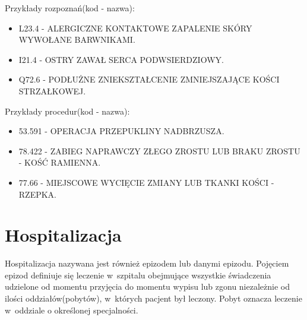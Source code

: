 Przykłady rozpoznań(kod - nazwa):
\begin{itemize}
\item L23.4 - ALERGICZNE KONTAKTOWE ZAPALENIE SKÓRY WYWOŁANE BARWNIKAMI.
\item I21.4 - OSTRY ZAWAŁ SERCA PODWSIERDZIOWY.
\item Q72.6 - PODŁUŻNE ZNIEKSZTAŁCENIE ZMNIEJSZAJĄCE KOŚCI STRZAŁKOWEJ.
\end{itemize}

Przykłady procedur(kod - nazwa):
\begin{itemize}
\item 53.591 - OPERACJA PRZEPUKLINY NADBRZUSZA.
\item 78.422 - ZABIEG NAPRAWCZY ZŁEGO ZROSTU LUB BRAKU ZROSTU - KOŚĆ RAMIENNA.
\item 77.66 - MIEJSCOWE WYCIĘCIE ZMIANY LUB TKANKI KOŚCI - RZEPKA.
\end{itemize}


\section{Hospitalizacja}
\label{sec:hospitalizacja}

Hospitalizacja nazywana jest również epizodem lub danymi epizodu. Pojęciem epizod definiuje się leczenie w~szpitalu obejmujące wszystkie świadczenia udzielone od momentu przyjęcia do momentu wypisu lub zgonu niezależnie od ilości oddziałów(pobytów), w~których pacjent był leczony. Pobyt oznacza leczenie w~oddziale o określonej specjalności\cite{algorytm_grupera}.

